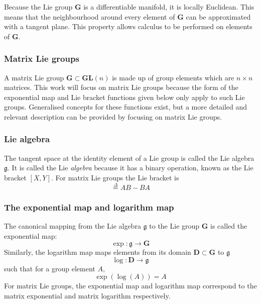 		Because the Lie group $\mathbf{G}$ is a differentiable manifold, it is locally Euclidean. This means that the neighbourhood around every element of $\mathbf{G}$ can be approximated with a tangent plane. This property allows calculus to be performed on elements of $\mathbf{G}$.
		
		\subsubsection{Matrix Lie groups}
			A matrix Lie group $\mathbf{G} \subset \mathbf{GL}(n)$ is made up of group elements which are $n \times n$ matrices.
			This work will focus on matrix Lie groups because the form of the exponential map and Lie bracket functions given below only apply to such Lie groups. Generalised concepts for these functions exist, but a more detailed and relevant description can be provided by focusing on matrix Lie groups.
		
		\subsubsection{Lie algebra}
			The tangent space at the identity element of a Lie group is called the Lie algebra $\mathfrak{g}$. It is called the Lie \textit{algebra} because it has a binary operation, known as the Lie bracket $[X,Y]$. For matrix Lie groups the Lie bracket is
			\begin{equation}
				[A,B] \stackrel{\Delta}{=} AB-BA
			\end{equation}
			
		\subsubsection{The exponential map and logarithm map}	
			The canonical mapping from the Lie algebra $\mathfrak{g}$ to the Lie group $\mathbf{G}$ is called the exponential map:
			\begin{equation}
				\exp: \mathfrak{g} \rightarrow \mathbf{G}
			\end{equation}			
			Similarly, the logarithm map maps elements from its domain $\mathbf{D} \subset \mathbf{G}$ to $\mathfrak{g}$
			\begin{equation}
				\log: \mathbf{D} \rightarrow \mathfrak{g}
			\end{equation}
			such that for a group element $A$,
			\begin{equation}
				\exp(\log(A)) = A
			\end{equation}
			For matrix Lie groups, the exponential map and logarithm map correspond to the matrix exponential and matrix logarithm respectively.
						
